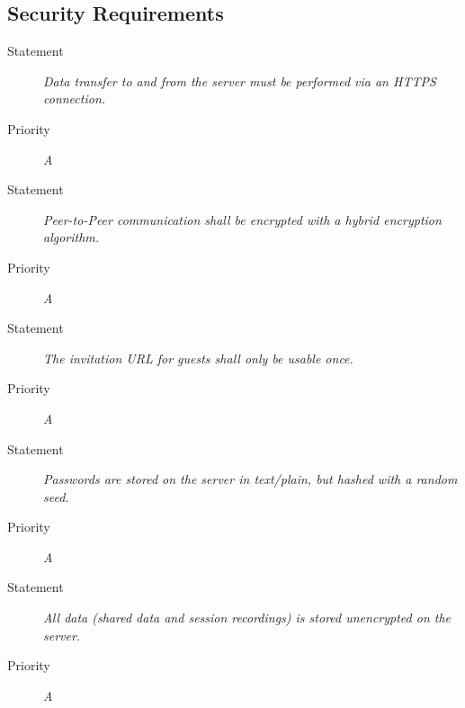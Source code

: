 \subsection{Security Requirements}
\NFR
\begin{description}
\item [Statement] \textit{Data transfer to and from the server must be
    performed via an \gls{HTTPS} connection.}
\item [Priority] \textit{A}
\end{description}

\NFR
\begin{description}
\item [Statement] \textit{Peer-to-Peer communication shall be encrypted with
    a hybrid encryption algorithm.}
\item [Priority] \textit{A}
\end{description}

\NFR
\begin{description}
  \item [Statement] \textit{The invitation URL for guests shall only be usable once.}
  \item [Priority] \textit{A}
\end{description}

\NFR
\begin{description}
\item [Statement] \textit{Passwords are stored on the server in text/plain,
    but hashed with a random seed.}
  \item [Priority] \textit{A}
\end{description}

\NFR
\begin{description}
\item [Statement] \textit{All data (shared data and session recordings) is
    stored unencrypted on the server.}
\item [Priority] \textit{A}
\end{description}